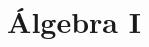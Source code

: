 \documentclass[12pt,a4paper,parskip=full]{scrbook}
\theoremstyle{definition}
\begin{document}
\title{Álgebra I}
\maketitle
\tableofcontents





\end{document}
